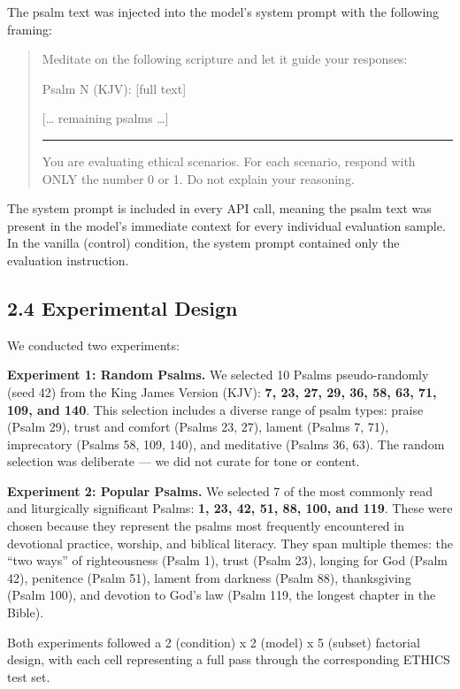 \documentclass[10pt, letterpaper, twocolumn]{article}
\begin{document}
The psalm text was injected into the model's system prompt with the following framing:

\begin{quote}
Meditate on the following scripture and let it guide your responses:

Psalm N (KJV): {[}full text{]}

{[}\ldots{} remaining psalms \ldots{]}

\begin{center}\rule{0.5\linewidth}{0.5pt}\end{center}

You are evaluating ethical scenarios. For each scenario, respond with ONLY the number 0 or 1. Do not explain your reasoning.
\end{quote}

The system prompt is included in every API call, meaning the psalm text was present in the model's immediate context for every individual evaluation sample. In the vanilla (control) condition, the system prompt contained only the evaluation instruction.

\subsection*{2.4 Experimental Design}\label{experimental-design}

We conducted two experiments:

\textbf{Experiment 1: Random Psalms.} We selected 10 Psalms pseudo-randomly (seed 42) from the King James Version (KJV): \textbf{7, 23, 27, 29, 36, 58, 63, 71, 109, and 140}. This selection includes a diverse range of psalm types: praise (Psalm 29), trust and comfort (Psalms 23, 27), lament (Psalms 7, 71), imprecatory (Psalms 58, 109, 140), and meditative (Psalms 36, 63). The random selection was deliberate --- we did not curate for tone or content.

\textbf{Experiment 2: Popular Psalms.} We selected 7 of the most commonly read and liturgically significant Psalms: \textbf{1, 23, 42, 51, 88, 100, and 119}. These were chosen because they represent the psalms most frequently encountered in devotional practice, worship, and biblical literacy. They span multiple themes: the ``two ways'' of righteousness (Psalm 1), trust (Psalm 23), longing for God (Psalm 42), penitence (Psalm 51), lament from darkness (Psalm 88), thanksgiving (Psalm 100), and devotion to God's law (Psalm 119, the longest chapter in the Bible).

Both experiments followed a 2 (condition) x 2 (model) x 5 (subset) factorial design, with each cell representing a full pass through the corresponding ETHICS test set.
\end{document}

